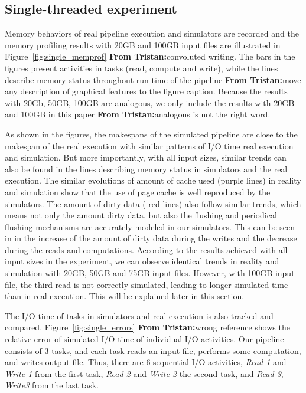 \documentclass[conference]{IEEEtran}
\newcommand{\tristan}[1]{\color{orange}\textbf{From Tristan:}#1\color{black}}
\begin{document}
        \subsection{Single-threaded experiment}

            Memory behaviors of real pipeline execution and simulators are recorded 
            and the memory profiling results with 20GB and 100GB input files 
            are illustrated in Figure~\ref{fig:single_memprof} \tristan{convoluted writing}. 
            The bars in the figures present activities in tasks (read, compute and write), 
            while the lines describe memory status throughout run time of the pipeline \tristan{move any description of graphical features to the figure caption}. 
            Because the results with 20Gb, 50GB, 100GB are analogous, we only include 
            the results with 20GB and 100GB in this paper \tristan{analogous is not the right word}. 
            
            As shown in the figures, the makespans of the simulated pipeline are 
            close to the makespan of the real execution with similar patterns of I/O time 
            real execution and simulation. 
            But more importantly, with all input sizes, similar trends can also be found 
            in the lines describing memory status in simulators and the real execution. 
            The similar evolutions of amount of cache used (purple lines) in reality 
            and simulation show that the use of page cache is well reproduced by the simulators. 
            The amount of dirty data ( red lines) also follow similar trends, 
            which means not only the amount dirty data, but also the flushing and 
            periodical flushing mechanisms are accurately modeled in our simulators. 
            This can be seen in in the increase of the amount of dirty data during the writes 
            and the decrease during the reads and computations. 
            According to the results achieved with all input sizes in the experiment, 
            we can observe identical trends in reality and simulation with 20GB, 
            50GB and 75GB input files. However, with 100GB input file, 
            the third read is not correctly simulated, leading to longer simulated time 
            than in real execution. This will be explained later in this section.
            
            The I/O time of tasks in simulators and real execution is also tracked and compared. 
            Figure~\ref{fig:single_errors} \tristan{wrong reference} shows the relative error of simulated I/O time 
            of individual I/O activities. 
            Our pipeline consists of 3 tasks, and each task reads an input file, 
            performs some computation, and writes output file. 
            Thus, there are 6 sequential I/O activities, \textit{Read 1} and \textit{Write 1} 
            from the first task, \textit{Read 2} and \textit{Write 2} the second task, 
            and \textit{Read 3}, \textit{Write3} from the last task.
            
\end{document}
